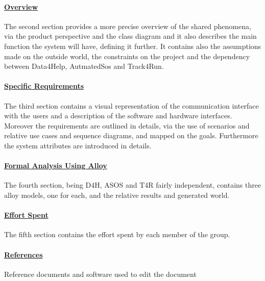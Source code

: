 \paragraph{\hyperref[sect:overview]{Overview}} The second section provides a more precise overview of the shared phenomena, via the product perspective and the class diagram and it also describes the main function the system will have, defining it further. It contains also the assumptions made on the outside world, the constraints on the project and the dependency between Data4Help, AutmatedSos and Track4Run.
\paragraph{\hyperref[sect:requirements]{Specific Requirements}} The third section contains a visual representation of the communication interface with the users and a description of the software and hardware interfaces. Moreover the requirements are outlined in details, via the use of scenarios and relative use cases and sequence diagrams, and mapped on the goals. Furthermore the system attributes are introduced in details.
\paragraph{\hyperref[sect:alloy]{Formal Analysis Using Alloy}} The fourth section, being D4H, ASOS and T4R fairly independent, contains three alloy models, one for each, and the relative results and generated world.
\paragraph{\hyperref[sect:effort]{Effort Spent}} The fifth section contains the effort spent by each member of the group.
\paragraph{\hyperref[sect:references]{References}} Reference documents and software used to edit the document


